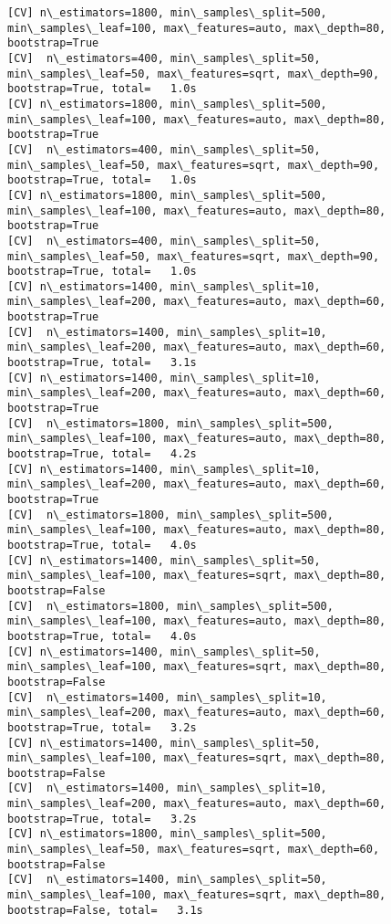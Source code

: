 \documentclass[11pt]{article}
\begin{document}
\begin{Verbatim}[commandchars=\\\{\}]
[CV] n\_estimators=1800, min\_samples\_split=500, min\_samples\_leaf=100, max\_features=auto, max\_depth=80, bootstrap=True 
[CV]  n\_estimators=400, min\_samples\_split=50, min\_samples\_leaf=50, max\_features=sqrt, max\_depth=90, bootstrap=True, total=   1.0s
[CV] n\_estimators=1800, min\_samples\_split=500, min\_samples\_leaf=100, max\_features=auto, max\_depth=80, bootstrap=True 
[CV]  n\_estimators=400, min\_samples\_split=50, min\_samples\_leaf=50, max\_features=sqrt, max\_depth=90, bootstrap=True, total=   1.0s
[CV] n\_estimators=1800, min\_samples\_split=500, min\_samples\_leaf=100, max\_features=auto, max\_depth=80, bootstrap=True 
[CV]  n\_estimators=400, min\_samples\_split=50, min\_samples\_leaf=50, max\_features=sqrt, max\_depth=90, bootstrap=True, total=   1.0s
[CV] n\_estimators=1400, min\_samples\_split=10, min\_samples\_leaf=200, max\_features=auto, max\_depth=60, bootstrap=True 
[CV]  n\_estimators=1400, min\_samples\_split=10, min\_samples\_leaf=200, max\_features=auto, max\_depth=60, bootstrap=True, total=   3.1s
[CV] n\_estimators=1400, min\_samples\_split=10, min\_samples\_leaf=200, max\_features=auto, max\_depth=60, bootstrap=True 
[CV]  n\_estimators=1800, min\_samples\_split=500, min\_samples\_leaf=100, max\_features=auto, max\_depth=80, bootstrap=True, total=   4.2s
[CV] n\_estimators=1400, min\_samples\_split=10, min\_samples\_leaf=200, max\_features=auto, max\_depth=60, bootstrap=True 
[CV]  n\_estimators=1800, min\_samples\_split=500, min\_samples\_leaf=100, max\_features=auto, max\_depth=80, bootstrap=True, total=   4.0s
[CV] n\_estimators=1400, min\_samples\_split=50, min\_samples\_leaf=100, max\_features=sqrt, max\_depth=80, bootstrap=False 
[CV]  n\_estimators=1800, min\_samples\_split=500, min\_samples\_leaf=100, max\_features=auto, max\_depth=80, bootstrap=True, total=   4.0s
[CV] n\_estimators=1400, min\_samples\_split=50, min\_samples\_leaf=100, max\_features=sqrt, max\_depth=80, bootstrap=False 
[CV]  n\_estimators=1400, min\_samples\_split=10, min\_samples\_leaf=200, max\_features=auto, max\_depth=60, bootstrap=True, total=   3.2s
[CV] n\_estimators=1400, min\_samples\_split=50, min\_samples\_leaf=100, max\_features=sqrt, max\_depth=80, bootstrap=False 
[CV]  n\_estimators=1400, min\_samples\_split=10, min\_samples\_leaf=200, max\_features=auto, max\_depth=60, bootstrap=True, total=   3.2s
[CV] n\_estimators=1800, min\_samples\_split=500, min\_samples\_leaf=50, max\_features=sqrt, max\_depth=60, bootstrap=False 
[CV]  n\_estimators=1400, min\_samples\_split=50, min\_samples\_leaf=100, max\_features=sqrt, max\_depth=80, bootstrap=False, total=   3.1s

\end{Verbatim}
\end{document}
